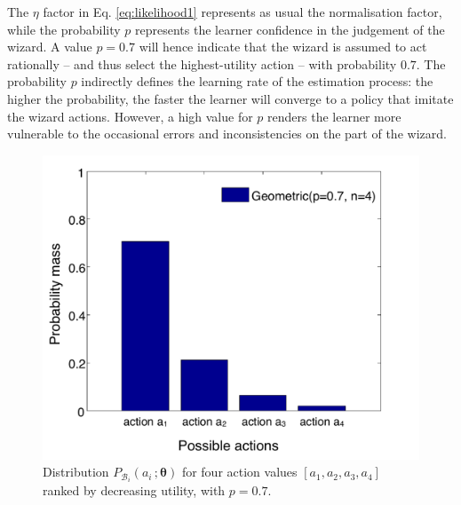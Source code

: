 The $\eta$ factor in Eq. \eqref{eq:likelihood1} represents as usual the normalisation factor, while the probability $p$  represents the learner confidence in the judgement of the wizard.  A value $p = 0.7$ will hence indicate that the wizard is assumed to act rationally -- and thus select the highest-utility action -- with probability $0.7$. The probability $p$ indirectly defines the learning rate of the estimation process: the higher the probability, the faster the learner will converge to a policy that imitate the wizard actions.  However, a high value for $p$ renders the learner more vulnerable to the occasional errors and inconsistencies on the part of the wizard. 


\begin{figure}
\vspace{-2mm}
\centering
\includegraphics[scale=0.35]{imgs/geometric.pdf} 
\vspace{-6mm}
\caption{Distribution $P_{\mathcal{B}_i}(a_i\,; \boldsymbol\theta)$ for four action values $[a_1, a_2, a_3, a_4]$ ranked by decreasing utility, with $p=0.7$.}
\label{fig:geometric}
\end{figure}

